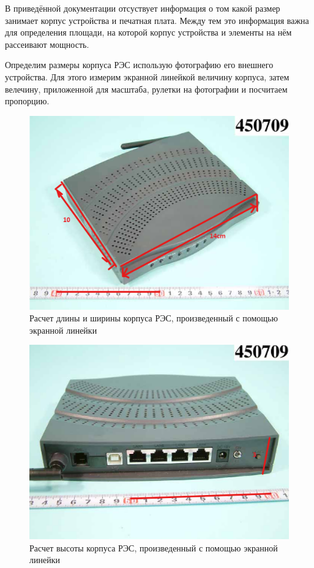 В приведённой документации отсуствует информация о том какой размер
занимает корпус устройства и печатная плата.
Между тем это информация важна для определения площади,
на которой корпус устройства и элементы на нём рассеивают мощность.

Определим размеры корпуса РЭС использую фотографию его внешнего
устройства. Для этого измерим экранной линейкой величину корпуса,
затем велечину, приложенной для масштаба, рулетки на фотографии и
посчитаем пропорцию.


\begin{figure}[h]
  \centering
  \includegraphics[scale=0.5]{images2/external_photos_size-0.png}
  \caption{Расчет длины и ширины корпуса РЭС, произведенный с помощью
экранной линейки}
\end{figure}



\begin{figure}[h]
  \centering
  \includegraphics[scale=0.5]{images2/external_photos_size-1.png}
  \caption{Расчет высоты корпуса РЭС, произведенный с помощью
экранной линейки}
\end{figure}
\newpage


